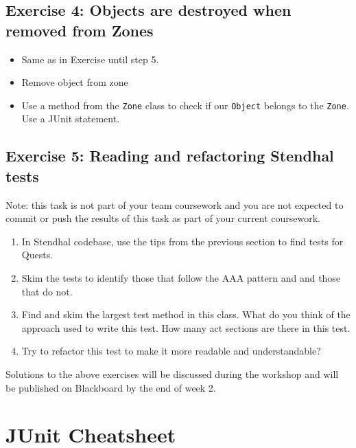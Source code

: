 \documentclass[
]{book}
\providecommand{\tightlist}{%
  \setlength{\itemsep}{0pt}\setlength{\parskip}{0pt}}
\begin{document}
\hypertarget{exercise-4-objects-are-destroyed-when-removed-from-zones}{%
\subsection{Exercise 4: Objects are destroyed when removed from Zones}\label{exercise-4-objects-are-destroyed-when-removed-from-zones}}

\begin{itemize}
\tightlist
\item
  Same as in Exercise until step 5.
\item
  Remove object from zone
\item
  Use a method from the \texttt{Zone} class to check if our \texttt{Object} belongs to the \texttt{Zone}. Use a JUnit statement.
\end{itemize}

\hypertarget{exercise-5-reading-and-refactoring-stendhal-tests}{%
\subsection{Exercise 5: Reading and refactoring Stendhal tests}\label{exercise-5-reading-and-refactoring-stendhal-tests}}

Note: this task is not part of your team coursework and you are not expected to commit or push the results of this task as part of your current coursework.

\begin{enumerate}
\def\labelenumi{\arabic{enumi}.}
\tightlist
\item
  In Stendhal codebase, use the tips from the previous section to find tests for Quests.
\item
  Skim the tests to identify those that follow the AAA pattern and and those that do not.
\item
  Find and skim the largest test method in this class. What do you think of the approach used to write this test. How many act sections are there in this test.
\item
  Try to refactor this test to make it more readable and understandable?
\end{enumerate}

Solutions to the above exercises will be discussed during the workshop and will be published on Blackboard by the end of week 2.

\hypertarget{junit-cheatsheet}{%
\section{JUnit Cheatsheet}\label{junit-cheatsheet}}
\end{document}

